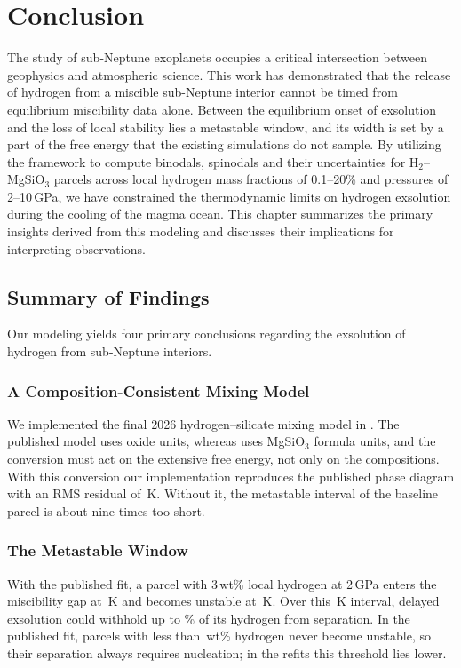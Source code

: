 \chapter{Conclusion}\label{ch:conclusion}

The study of sub-Neptune exoplanets occupies a critical intersection between geophysics and
atmospheric science. This work has demonstrated that the release of hydrogen from a miscible
sub-Neptune interior cannot be timed from equilibrium miscibility data alone. Between the
equilibrium onset of exsolution and the loss of local stability lies a metastable window,
and its width is set by a part of the free energy that the existing simulations do not
sample. By utilizing the \Atm{} framework to compute binodals, spinodals and their
uncertainties for H$_2$--MgSiO$_3$ parcels across local hydrogen mass fractions of 0.1--20\%
and pressures of 2--10\,GPa, we have constrained the thermodynamic limits on hydrogen
exsolution during the cooling of the magma ocean. This chapter summarizes the primary
insights derived from this modeling and discusses their implications for interpreting
observations.

\section{Summary of Findings}

Our modeling yields four primary conclusions regarding the exsolution of hydrogen from
sub-Neptune interiors.

\subsection{A Composition-Consistent Mixing Model}

We implemented the final 2026 hydrogen--silicate mixing model in \Atm{}. The published model
uses oxide units, whereas \Atm{} uses MgSiO$_3$ formula units, and the conversion must act on
the extensive free energy, not only on the compositions. With this conversion our
implementation reproduces the published phase diagram with an RMS residual of \digRms{}\,K.
Without it,
the metastable interval of the baseline parcel is about nine times too short.

\subsection{The Metastable Window}

With the published fit, a parcel with 3\,wt\% local hydrogen at 2\,GPa enters the miscibility
gap at \pubTbTwo{}\,K and becomes unstable at \pubTspTwo{}\,K. Over this \pubIntTwo{}\,K
interval, delayed exsolution could withhold up to \pubFhTwo{}\% of its hydrogen from
separation. In the published fit, parcels with less than \pubThreshold{}\,wt\% hydrogen never
become unstable, so their separation always requires nucleation; in the refits this threshold
lies lower.

